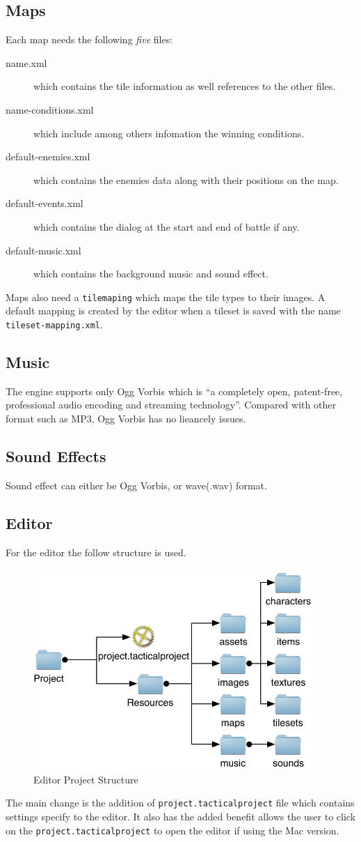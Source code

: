\subsection{Maps}
\label{sub:amaps}

Each map needs the following \emph{five} files:
\begin{description}
	\item[name.xml] which contains the tile information as well references to the other files. 
	\item[name-conditions.xml]  which include among others infomation the  winning conditions. 
	\item[default-enemies.xml]  which contains the enemies data along with their positions on the map.
	\item[default-events.xml]   which contains the dialog at the start and end of battle if any.
	\item[default-music.xml]    which contains the background music and sound effect.
\end{description}

Maps also need a \texttt{tilemaping} which maps the tile types to their images.  A default mapping is created by the editor when a tileset is saved with the name \texttt{tileset-mapping.xml}.

\subsection{Music}
The engine supports only Ogg Vorbis which is ``a completely open, patent-free, professional audio encoding and streaming technology''.
Compared with other format such as MP3, Ogg Vorbis has no lieancely issues. 

\subsection{Sound Effects}
Sound effect can either be Ogg Vorbis, or wave(.wav) format. 

\clearpage
\subsection{Editor}
For the editor the follow structure is used.

\begin{figure}[htbp]
	\centering
		\includegraphics[height=3in]{figures/project.pdf}
	\caption{Editor Project Structure}
	\label{fig:figures_project}
\end{figure}

The main change is the addition of \texttt{project.tacticalproject} file which contains settings specify to the editor. It also has the added benefit allows the user to click on the \texttt{project.tacticalproject} to open the editor if using the Mac version.